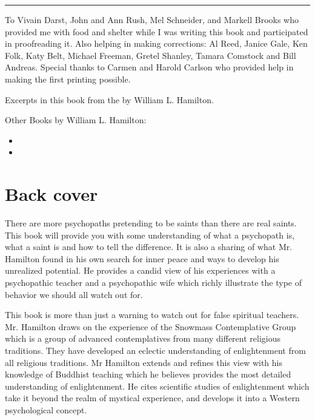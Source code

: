 \documentclass[a5paper,10pt,english]{book}
\begin{document}
\bigskip\hrule\bigskip


\sphinxAtStartPar
{}

\sphinxAtStartPar
To Vivain Darst, John and Ann Rush, Mel Schneider, and Markell Brooks
who provided me with food and shelter while I was writing this book and
participated in proofreading it. Also helping in making corrections: Al
Reed, Janice Gale, Ken Folk, Katy Belt, Michael Freeman, Gretel Shanley,
Tamara Comstock and Bill Andreas. Special thanks to Carmen and Harold
Carlson who provided help in making the first printing possible.

\sphinxAtStartPar
Excerpts in this book from the  by William L. Hamilton.

\sphinxAtStartPar
Other Books by William L. Hamilton:
\begin{itemize}
\item {} 
\sphinxAtStartPar
{}

\item {} 
\sphinxAtStartPar
{}

\end{itemize}


\section{Back cover}
\label{\detokenize{covers:back-cover}}
\sphinxAtStartPar
There are more psychopaths pretending to be saints than there are real saints. This book will provide you with some understanding of what a psychopath is, what a saint is and how to tell the difference. It is also a sharing of what Mr. Hamilton found in his own search for inner peace and ways to develop his unrealized potential. He provides a candid view of his experiences with a psychopathic teacher and a psychopathic wife which richly illustrate the type of behavior we should all watch out for.

\sphinxAtStartPar
This book is more than just a warning to watch out for false spiritual teachers. Mr. Hamilton draws on the experience of the Snowmass Contemplative Group which is a group of advanced contemplatives from many different religious traditions. They have developed an eclectic understanding of enlightenment from all religious traditions. Mr Hamilton extends and refines this view with his knowledge of Buddhist teaching which he believes provides the most detailed understanding of enlightenment. He cites scientific studies of enlightenment which take it beyond the realm of mystical experience, and develops it into a Western psychological concept.
\end{document}

